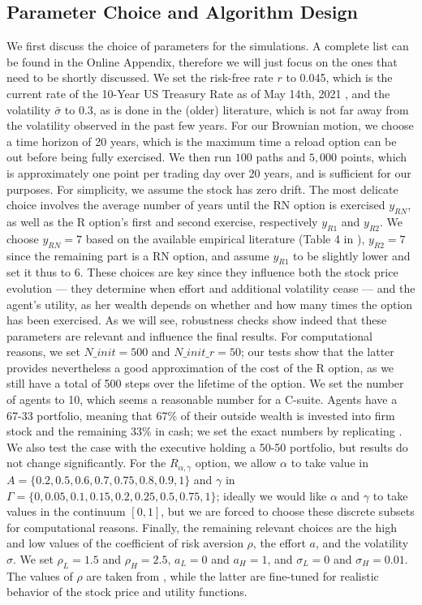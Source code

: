 \subsection{Parameter Choice and Algorithm Design}
We first discuss the choice of parameters for the simulations. A complete list can be found in the Online Appendix,
therefore we will just focus on the ones that need to be shortly discussed. We set the risk-free rate $r$ to 0.045, which is the current rate of the 10-Year US Treasury Rate as of May 14th, 2021 \citep{ychartrfrate}, and the volatility $\bar{\sigma}$ to 0.3, as is done in the (older) literature, which is not far away from the volatility observed in the past few years. For our Brownian motion, we choose a time horizon of 20 years, which is the maximum time a reload option can be out before being fully exercised. We then run $100$ paths and $5,000$ points, which is approximately one point per trading day over 20 years, and is sufficient for our purposes. For simplicity, we assume the stock has zero drift. The most delicate choice involves the average number of years until the RN option is exercised $y_{RN}$, as well as the R option's first and second exercise, respectively $y_{R1}$ and $y_{R2}$. We choose $y_{RN} = 7$ based on the available empirical literature (Table 4 in \citet{murphy2019employees}), $y_{R2} = 7$ since the remaining part is a RN option, and assume $y_{R1}$ to be slightly lower and set it thus to 6. These choices are key since they influence both the stock price evolution --- they determine when effort and additional volatility cease --- and the agent's utility, as her wealth depends on whether and how many times the option has been exercised. As we will see, robustness checks show indeed that these parameters are relevant and influence the final results. For computational reasons, we set $N\_init = 500$ and $N\_init\_r = 50$; our tests show that the latter provides nevertheless a good approximation of the cost of the R option, as we still have a total of 500 steps over the lifetime of the option. We set the number of agents to 10, which seems a reasonable number for a C-suite. Agents have a 67-33 portfolio, meaning that 67\% of their outside wealth is invested into firm stock and the remaining 33\% in cash; we set the exact numbers by replicating \citet{carpenter1998exercise}. We also test the case with the executive holding a 50-50 portfolio, but results do not change significantly. For the $R_{\alpha, \gamma}$ option, we allow $\alpha$ to take value in $A = \{0.2, 0.5, 0.6, 0.7, 0.75, 0.8, 0.9, 1\}$ and $\gamma$ in $\Gamma = \{0, 0.05, 0.1, 0.15, 0.2, 0.25, 0.5, 0.75, 1\}$; ideally we would like $\alpha$ and $\gamma$ to take values in the continuum $[0, 1]$, but we are forced to choose these discrete subsets for computational reasons. Finally, the remaining relevant choices are the high and low values of the coefficient of risk aversion $\rho$, the effort $a$, and the volatility $\sigma$. We set $\rho_L = 1.5$ and $\rho_H = 2.5$, $a_L = 0$ and $a_H = 1$, and $\sigma_L = 0$ and $\sigma_H = 0.01$. The values of $\rho$ are taken from \citet{carpenter1998exercise}, while the latter are fine-tuned for realistic behavior of the stock price and utility functions. 

